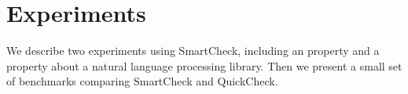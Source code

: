 \documentclass{sigplanconf}
\newcommand{\ttp}[1]{\texttt{#1}}
\begin{document}
\section{Experiments}\label{sec:experiments}
We describe two experiments using SmartCheck, including an \xmonad property and a
property about a natural language processing library.  Then we present a small
set of benchmarks comparing SmartCheck and QuickCheck.

\end{document}
